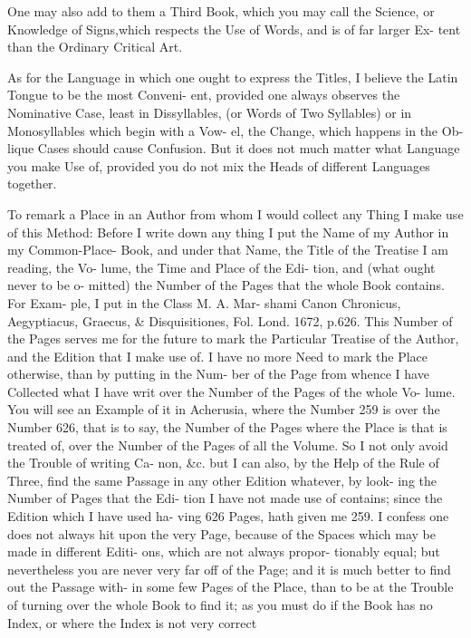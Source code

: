 One may also add to them a Third
Book, which you may call the Science,
or Knowledge of Signs,which respects the
Use of Words, and is of far larger Ex-
tent than the Ordinary Critical Art.

As for the Language in which one
ought to express the Titles, I believe the
Latin Tongue to be the most Conveni-
ent, provided one always observes the
Nominative Case, least in Dissyllables,
(or Words of Two Syllables) or in
Monosyllables which begin with a Vow-
el, the Change, which happens in the Ob-
lique Cases should cause Confusion. But
it does not much matter what Language
you make Use of, provided you do not
mix the Heads of different Languages
together.

To remark a Place in an Author from
whom I would collect any Thing I
make use of this Method: Before I
write down any thing I put the Name
of my Author in my Common-Place-
Book, and under that Name, the Title
of the Treatise I am reading, the Vo-
lume, the Time and Place of the Edi-
tion, and (what ought never to be o-
mitted) the Number of the Pages that
the whole Book contains. For Exam-
ple, I put in the Class M. A. Mar-
shami Canon Chronicus, Aegyptiacus,
Graecus, & Disquisitiones, Fol. Lond.
1672, p.626. This Number of the
Pages serves me for the future to mark
the Particular Treatise of the Author,
and the Edition that I make use of. I
have no more Need to mark the Place
otherwise, than by putting in the Num-
ber of the Page from whence I have
Collected what I have writ over the
Number of the Pages of the whole Vo-
lume. You will see an Example of it
in Acherusia, where the Number 259
is over the Number 626, that is to say,
the Number of the Pages where the Place
is that is treated of, over the Number
of the Pages of all the Volume. So I not
only avoid the Trouble of writing Ca-
non, &c. but I can also, by the Help of
the Rule of Three, find the same Passage
in any other Edition whatever, by look-
ing the Number of Pages that the Edi-
tion I have not made use of contains;
since the Edition which I have used ha-
ving 626 Pages, hath given me 259. I
confess one does not always hit upon
the very Page, because of the Spaces
which may be made in different Editi-
ons, which are not always propor-
tionably equal; but nevertheless you are
never very far off of the Page; and it is
much better to find out the Passage with-
in some few Pages of the Place, than to
be at the Trouble of turning over the
whole Book to find it; as you must
do if the Book has no Index, or where
the Index is not very correct


